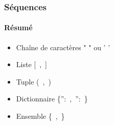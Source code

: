 \begin{frame}[fragile]
\frametitle{Séquences}
\framesubtitle{Résumé}
\begin{itemize}
 \item Chaîne de caractères " " ou ' '
 \item Liste [\ ,\ ]
 \item Tuple (\ ,\ )
 \item Dictionnaire \{'':\ ,\ '':\ \}
 \item Ensemble \{\ ,\ \} 
\end{itemize}
\end{frame}
